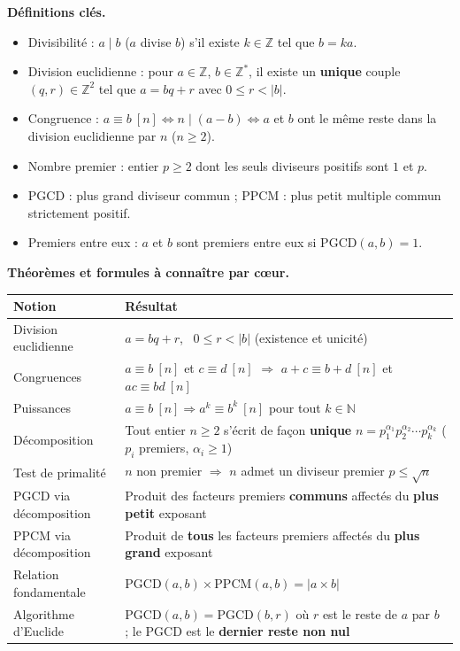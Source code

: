 \documentclass[11pt]{article}
\newcommand{\cle}[1]{{\popxbold\color{popdark}#1}}
\begin{document}
\begin{propriete}
\textbf{Définitions clés.}
\begin{itemize}
\item \cle{Divisibilité} : $a\mid b$ ($a$ divise $b$) s'il existe $k\in\mathbb{Z}$ tel que $b=ka$.
\item \cle{Division euclidienne} : pour $a\in\mathbb{Z}$, $b\in\mathbb{Z}^*$, il existe un \textbf{unique} couple $(q,r)\in\mathbb{Z}^2$ tel que $a=bq+r$ avec $0\le r<|b|$.
\item \cle{Congruence} : $a\equiv b\ [n] \Leftrightarrow n\mid(a-b) \Leftrightarrow a$ et $b$ ont le même reste dans la division euclidienne par $n$ ($n\ge 2$).
\item \cle{Nombre premier} : entier $p\ge 2$ dont les seuls diviseurs positifs sont $1$ et $p$.
\item \cle{PGCD} : plus grand diviseur commun ; \cle{PPCM} : plus petit multiple commun strictement positif.
\item \cle{Premiers entre eux} : $a$ et $b$ sont premiers entre eux si $\mathrm{PGCD}(a,b)=1$.
\end{itemize}

\textbf{Théorèmes et formules à connaître par cœur.}
\begin{center}
\begin{tabularx}{\linewidth}{|l|X|}
\hline
\rowcolor{popblueL} \textbf{Notion} & \textbf{Résultat} \\
\hline
Division euclidienne & $a=bq+r$, \ $0\le r<|b|$ (existence et unicité) \\
\hline
Congruences & $a\equiv b\ [n]$ et $c\equiv d\ [n]$ $\Rightarrow$ $a+c\equiv b+d\ [n]$ et $ac\equiv bd\ [n]$ \\
\hline
Puissances & $a\equiv b\ [n] \Rightarrow a^k\equiv b^k\ [n]$ pour tout $k\in\mathbb{N}$ \\
\hline
Décomposition & Tout entier $n\ge 2$ s'écrit de façon \textbf{unique} $n=p_1^{\alpha_1}p_2^{\alpha_2}\cdots p_k^{\alpha_k}$ ($p_i$ premiers, $\alpha_i\ge 1$) \\
\hline
Test de primalité & $n$ non premier $\Rightarrow$ $n$ admet un diviseur premier $p\le\sqrt{n}$ \\
\hline
PGCD via décomposition & Produit des facteurs premiers \textbf{communs} affectés du \textbf{plus petit} exposant \\
\hline
PPCM via décomposition & Produit de \textbf{tous} les facteurs premiers affectés du \textbf{plus grand} exposant \\
\hline
Relation fondamentale & $\mathrm{PGCD}(a,b)\times\mathrm{PPCM}(a,b)=|a\times b|$ \\
\hline
Algorithme d'Euclide & $\mathrm{PGCD}(a,b)=\mathrm{PGCD}(b,r)$ où $r$ est le reste de $a$ par $b$ ; le PGCD est le \textbf{dernier reste non nul} \\
\hline
\end{tabularx}
\end{center}


\end{propriete}
\end{document}
